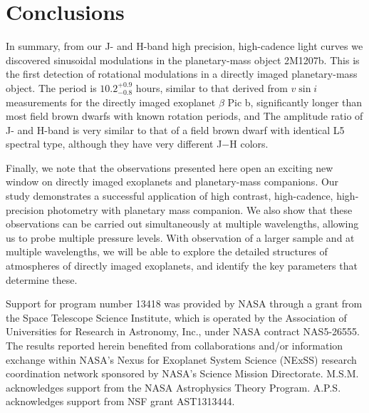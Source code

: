 \documentclass[apj]{emulateapj}
\newcommand{\bpic}{$\beta$ Pic}
\newcommand{\vsini}{$v\sin i$}
\newcommand{\revise}[1]{\textit{\textbf{{\color{red}{#1}}}}}
\begin{document}



\section{Conclusions}
In summary, from our J- and H-band high precision, high-cadence light
curves we discovered sinusoidal modulations in the planetary-mass
object 2M1207b. This is the first detection of rotational modulations
in a directly imaged planetary-mass object.  The period is
$10.2^{+0.9}_{-0.8}$ hours, similar to that derived from \vsini{} 
measurements for the directly imaged exoplanet \bpic{} b, 
significantly longer than most field brown dwarfs with known rotation
periods, and \revise{comparable to  the brown dwarfs
in a sample with similar age to 2M1207b.} The amplitude ratio of J- and H-band is very
similar to that of a field brown dwarf with identical L5 spectral type, although they have
very different J$-$H colors.

Finally, we note that the observations presented here open an exciting
new window on directly imaged exoplanets and planetary-mass
companions. Our study demonstrates a successful application of
high contrast, high-cadence, high-precision photometry with planetary
mass companion. We also show that these observations can be carried
out simultaneously at multiple wavelengths, allowing us to probe
multiple pressure levels. With observation of a larger sample and at
multiple wavelengths, we will be able to explore the detailed
structures of atmospheres of directly imaged exoplanets, and identify
the key parameters that determine these.

\acknowledgments

Support for program number 13418 was provided by NASA through a grant
from the Space Telescope Science Institute, which is operated by the
Association of Universities for Research in Astronomy, Inc., under
NASA contract NAS5-26555. The results reported herein benefited from
collaborations and/or information exchange within NASA's Nexus for
Exoplanet System Science (NExSS) research coordination network
sponsored by NASA's Science Mission Directorate. M.S.M. acknowledges
support from the NASA Astrophysics Theory Program. A.P.S. acknowledges
support from NSF grant AST1313444.

\end{document}
